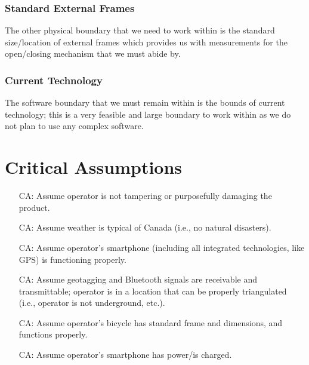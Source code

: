 \documentclass{article}
\newcounter{canum} %
\begin{document}
\subsubsection{Standard External Frames}
The other physical boundary that we need to work within is the standard size/location of external frames which provides us with measurements for the open/closing mechanism that we must abide by.
\subsubsection{Current Technology}
The software boundary that we must remain within is the bounds of current technology; this is a very feasible and large boundary to work within as we do not plan to use any complex software.

\section{Critical Assumptions}

\begin{itemize}

\item[CA\refstepcounter{canum}\thecanum\label{CA1}:] Assume operator is not tampering or purposefully damaging the product.
\item[CA\refstepcounter{canum}\thecanum\label{CA2}:] Assume weather is typical of Canada (i.e., no natural disasters).
\item[CA\refstepcounter{canum}\thecanum\label{CA3}:] Assume operator's smartphone (including all integrated technologies, like GPS) is functioning properly.
\item[CA\refstepcounter{canum}\thecanum\label{CA4}:] Assume geotagging and Bluetooth signals are receivable and transmittable; operator is in a location that can be properly triangulated (i.e., operator is not underground, etc.). 
\item[CA\refstepcounter{canum}\thecanum\label{CA5}:] Assume operator's bicycle has standard frame and dimensions, and functions properly.
\item[CA\refstepcounter{canum}\thecanum\label{CA6}:] Assume operator's smartphone has power/is charged. 

\end{itemize}
\end{document}
